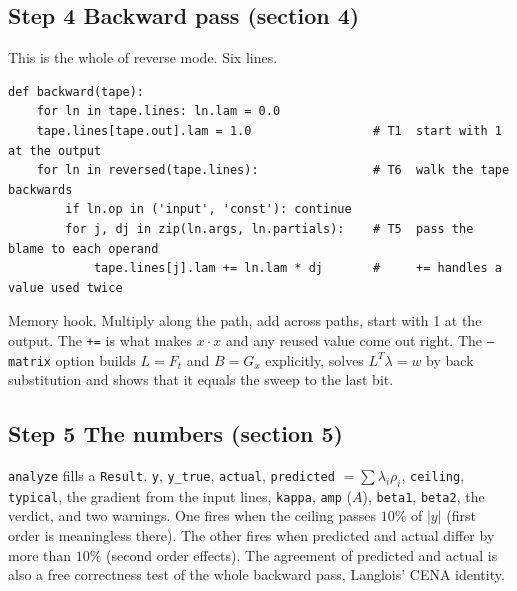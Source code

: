 \documentclass[11pt]{article}
\newcommand{\lam}{\lambda}
\begin{document}
\subsection*{Step 4 \quad Backward pass (section 4)}
This is the whole of reverse mode. Six lines.
\begin{lstlisting}
def backward(tape):
    for ln in tape.lines: ln.lam = 0.0
    tape.lines[tape.out].lam = 1.0                 # T1  start with 1 at the output
    for ln in reversed(tape.lines):                # T6  walk the tape backwards
        if ln.op in ('input', 'const'): continue
        for j, dj in zip(ln.args, ln.partials):    # T5  pass the blame to each operand
            tape.lines[j].lam += ln.lam * dj       #     += handles a value used twice
\end{lstlisting}
Memory hook. Multiply along the path, add across paths, start with 1 at the output. The \texttt{+=} is what makes $x\cdot x$ and any reused value come out right. The \texttt{--matrix} option builds $L = F_t$ and $B = G_x$ explicitly, solves $L^{T}\lam = w$ by back substitution and shows that it equals the sweep to the last bit.

\subsection*{Step 5 \quad The numbers (section 5)}
\texttt{analyze} fills a \texttt{Result}. \texttt{y}, \texttt{y\_true}, \texttt{actual}, \texttt{predicted} $=\sum\lam_i\rho_i$, \texttt{ceiling}, \texttt{typical}, the gradient from the input lines, \texttt{kappa}, \texttt{amp} ($A$), \texttt{beta1}, \texttt{beta2}, the verdict, and two warnings. One fires when the ceiling passes $10\%$ of $|y|$ (first order is meaningless there). The other fires when predicted and actual differ by more than $10\%$ (second order effects). The agreement of predicted and actual is also a free correctness test of the whole backward pass, Langlois' CENA identity.
\end{document}
